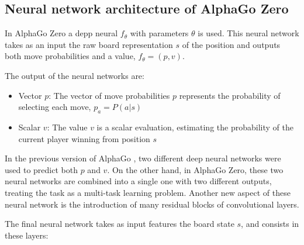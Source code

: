 \documentclass{article}
\begin{document}
\subsection{Neural network architecture  of AlphaGo Zero}
In AlphaGo Zero a depp neural $f_\theta$ with parameters $\theta$ is used. This neural network takes as an input the raw board representation $s$ of the position and outputs both move probabilities and a value, $f_\theta = (p,v)$. 

The output of the neural networks are:
\begin{itemize}
	\item Vector $p$: The vector of move probabilities $p$ represents the probability of selecting each move, $p_a = P(a | s)$
	\item Scalar $v$: The value $v$ is a scalar evaluation, estimating the probability of the current player winning from position $s$
\end{itemize}
In the previous version of AlphaGo \cite{Silver_2016}, two different deep neural networks were used to predict both $p$ and $v$. On the other hand, in AlphaGo Zero, these two neural networks are combined into a single one with two different outputs, treating the task as a multi-task learning problem. Another new aspect of these neural network is the introduction of many residual blocks of convolutional layers.

The final neural network takes as input features the board state $s$,  and consists in these layers:
\end{document}
